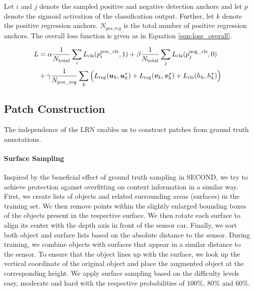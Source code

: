 \documentclass{article}
\begin{document}
Let $i$ and $j$ denote the sampled positive and negative detection anchors and let $p$ denote the sigmoid activation of the classification output. Further, let $k$ denote the positive regression anchors. $N_{pos\_reg}$ is the total number of positive regression anchors. The overall loss function is given as in Equation \eqref{eqn:loss_overall}.

\begin{equation}
\begin{aligned}
 L &= \alpha\frac{1}{N_{\text{\scriptsize total}}} \sum\limits_{i} L_{\text{\scriptsize cls}}(p^{\text{\scriptsize pos\_cls}}_i, 1) 
     + \beta\frac{1}{N_{\text{\scriptsize total}}} \sum\limits_{j} L_{\text{\scriptsize cls}}(p^{\text{\scriptsize neg\_cls}}_j, 0) \\
     &+ \gamma \frac{1}{N_{\text{\scriptsize pos\_reg}}} \sum\limits_{k} \Big(L_{\text{\scriptsize reg}}(\bm{u}_k, \bm{u}^*_k) 
    + L_{\text{\scriptsize{reg}}}(\bm{v}_k,\bm{v}^*_k) + L_{\text{\scriptsize cls}}(h_k,h_k^*)\Big)\\
 \end{aligned}
 \label{eqn:loss_overall}
 \end{equation}

\subsection{Patch Construction}\label{sec:augmentation}
The independence of the LRN enables us to construct patches from ground truth annotations.

\paragraph{Surface Sampling}
Inspired by the beneficial effect of ground truth sampling in SECOND, we try to achieve protection against overfitting on context information in a similar way. First, we create lists of objects and related surrounding areas (surfaces) in the training set. We then remove points within the slightly enlarged bounding boxes of the objects present in the respective surface. We then rotate each surface to align its center with the depth axis in front of the sensor car. Finally, we sort both object and surface lists based on the absolute distance to the sensor. 
During training, we combine objects with surfaces that appear in a similar distance to the sensor. To ensure that the object lines up with the surface, we look up the vertical coordinate of the original object and place the augmented object at the corresponding height. We apply surface sampling based on the difficulty levels easy, moderate and hard with the respective probabilities of $100\%$, $80\%$ and $60\%$.
\end{document}
